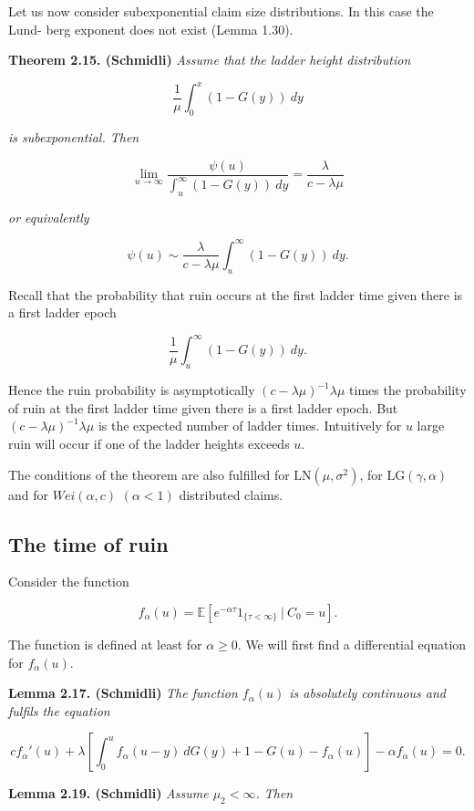 \documentclass[a4paper,12pt,openany]{book}
\begin{document}
Let us now consider subexponential claim size distributions. In this case the Lund- berg exponent does not exist (Lemma 1.30).

\textbf{Theorem 2.15. (Schmidli)} \emph{Assume that the ladder height distribution}

\[
\frac{1}{\mu}\int_0^x(1-G(y))\ dy
\]

\emph{is subexponential. Then}

\[
\lim_{u\to\infty}\frac{\psi(u)}{\int_u^\infty (1-G(y))\ dy}=\frac{\lambda}{c-\lambda\mu}
\]

\emph{or equivalently}

\[
\psi(u)\sim \frac{\lambda}{c-\lambda\mu}\int_u^\infty (1-G(y))\ dy.
\]

Recall that the probability that ruin occurs at the first ladder time given there is a first ladder epoch

\[
\frac{1}{\mu}\int_u^\infty(1-G(y))\ dy.
\]

Hence the ruin probability is asymptotically \((c − \lambda\mu)^{-1}\lambda\mu\) times the probability of ruin at the first ladder time given there is a first ladder epoch. But \((c − \lambda\mu)^{-1}\lambda\mu\) is the expected number of ladder times. Intuitively for \(u\) large ruin will occur if one of the ladder heights exceeds \(u\).

The conditions of the theorem are also fulfilled for \(\text{LN}(\mu,\sigma^2)\), for \(\text{LG}(\gamma ,\alpha)\) and for \(Wei(\alpha, c)\) \((\alpha < 1)\) distributed claims.

\hypertarget{the-time-of-ruin}{%
\subsection{The time of ruin}\label{the-time-of-ruin}}

Consider the function

\[
f_\alpha(u)=\mathbb E[e^{-\alpha \tau}1_{\{\tau<\infty\}}\ \vert\ C_0=u].
\]

The function is defined at least for \(\alpha\ge 0\). We will first find a differential equation for \(f_\alpha(u)\).

\textbf{Lemma 2.17. (Schmidli)} \emph{The function \(f_\alpha(u)\) is absolutely continuous and fulfils the equation}

\[
cf_\alpha'(u)+\lambda\left[\int_0^u f_\alpha(u-y)\ dG(y) + 1 -G(u)-f_\alpha (u)\right] - \alpha f_\alpha(u)=0.
\]

\textbf{Lemma 2.19. (Schmidli)} \emph{Assume \(\mu_2<\infty\). Then}
\end{document}
